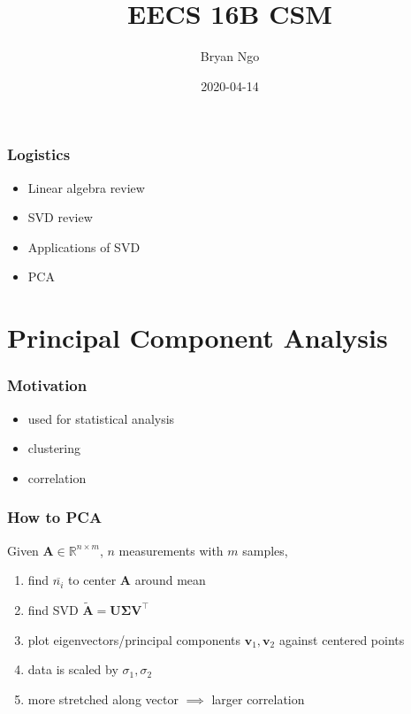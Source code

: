 \documentclass[aspectratio=169]{beamer}
\title{EECS 16B CSM}
\author{Bryan Ngo}
\date{2020-04-14}
\institute{UC Berkeley}
\newcommand{\R}{\mathbb{R}}
\begin{document}
\begin{frame}
    \maketitle
\end{frame}

\begin{frame}
    \frametitle{Logistics}

    \begin{itemize}
        \item Linear algebra review
        \item SVD review
        \item Applications of SVD
        \item PCA
    \end{itemize}
\end{frame}

\section{Principal Component Analysis}

\begin{frame}
    \frametitle{Motivation}

    \begin{itemize}
        \item used for statistical analysis
        \item clustering
        \item correlation
    \end{itemize}
\end{frame}

\begin{frame}
    \frametitle{How to PCA}

    Given \(\bm{A} \in \R^{n \times m}\), \(n\) measurements with \(m\) samples,
    \begin{enumerate}
        \item find \(\overline{n_i}\) to center \(\bm{A}\) around mean
        \item find SVD \(\widetilde{\bm{A}} = \bm{U \Sigma V}^\top\)
        \item plot eigenvectors/principal components \(\bm{v}_1, \bm{v}_2\) against centered points
        \item data is scaled by \(\sigma_1, \sigma_2\)
        \item more stretched along vector \(\implies\) larger correlation
    \end{enumerate}
\end{frame}
\end{document}
